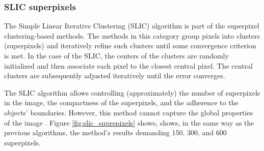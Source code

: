 \subsubsection{SLIC superpixels}
The Simple Linear Iterative Clustering (SLIC) algorithm is part of the superpixel clustering-based methods. The methods in this category group pixels into clusters (superpixels) and iteratively refine such clusters until some convergence criterion is met. In the case of the SLIC, the centers of the clusters are randomly initialized and then associate each pixel to the closest central pixel. The central clusters are subsequently adjusted iteratively until the error converges.

The SLIC algorithm allows controlling (approximately) the number of superpixels in the image, the compactness of the superpixels, and the adherence to the objects' boundaries. However, this method cannot capture the global properties of the image \citep{Stutz.Hermans.ea:CVIU:2018}. Figure \ref{fig:slic_suprepixels} shows, shows, in the same way as the previous algorithms, the method's results demanding 150, 300, and 600 superpixels.



